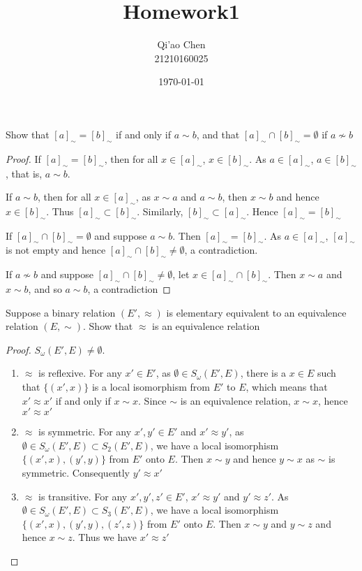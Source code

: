 \documentclass[11pt]{article}
\author{Qi'ao Chen\\21210160025}
\date{\today}
\title{Homework1}
\begin{document}
\maketitle
\begin{exercise}[0]
Show that \([a]_\sim=[b]_\sim\) if and only if \(a\sim b\), and that \([a]_\sim\cap[b]_\sim=\emptyset\) if \(a\not\sim b\)
\end{exercise}

\begin{proof}
If \([a]_\sim=[b]_\sim\), then for all \(x\in[a]_\sim\), \(x\in[b]_\sim\). As \(a\in[a]_\sim\), \(a\in[b]_\sim\), that
is, \(a\sim b\).

If \(a\sim b\), then for all \(x\in[a]_\sim\), as \(x\sim a\) and \(a\sim b\), then \(x\sim b\) and
hence \(x\in[b]_\sim\). Thus \([a]_\sim\subset[b]_\sim\). Similarly, \([b]_\sim\subset[a]_\sim\). Hence \([a]_\sim=[b]_\sim\)

If \([a]_\sim\cap[b]_\sim=\emptyset\) and suppose \(a\sim b\). Then \([a]_\sim=[b]_\sim\). As \(a\in[a]_\sim\), \([a]_\sim\) is not
empty and hence \([a]_\sim\cap[b]_\sim\neq\emptyset\), a contradiction.

If \(a\not\sim b\) and suppose \([a]_\sim\cap[b]_\sim\neq\emptyset\), let \(x\in[a]_\sim\cap[b]_\sim\). Then \(x\sim a\) and \(x\sim b\),
and so \(a\sim b\), a contradiction
\end{proof}

\begin{exercise}
\label{ex1}
Suppose a binary relation \((E',\approx)\) is elementary equivalent to an equivalence relation \((E,\sim)\).
Show that \(\approx\) is an equivalence relation
\end{exercise}

\begin{proof}
\(S_\omega(E',E)\neq\emptyset\).
\begin{enumerate}
\item \(\approx\) is reflexive. For any \(x'\in E'\), as \(\emptyset\in S_\omega(E',E)\), there is a \(x\in E\) such
that \(\{(x',x)\}\) is a local isomorphism from \(E'\) to \(E\), which means that \(x'\approx x'\) if and
only if \(x\sim x\). Since \(\sim\) is an equivalence relation, \(x\sim x\), hence \(x'\approx x'\)
\item \(\approx\) is symmetric. For any \(x',y'\in E'\) and \(x'\approx y'\), as \(\emptyset\in S_\omega(E',E)\subset S_2(E',E)\), we have
a local isomorphism \(\{(x',x),(y',y)\}\) from \(E'\) onto \(E\). Then \(x\sim y\) and hence \(y\sim x\)
as \(\sim\) is symmetric. Consequently \(y'\approx x'\)
\item \(\approx\) is transitive. For any \(x',y',z'\in E'\), \(x'\approx y'\) and \(y'\approx z'\).
As \(\emptyset\in S_\omega(E',E)\subset S_3(E',E)\), we have a local isomorphism \(\{(x',x),(y',y),(z',z)\}\) from \(E'\)
onto \(E\). Then \(x\sim y\) and \(y\sim z\) and hence \(x\sim z\). Thus we have \(x'\approx z'\)
\end{enumerate}
\end{proof}
\end{document}
